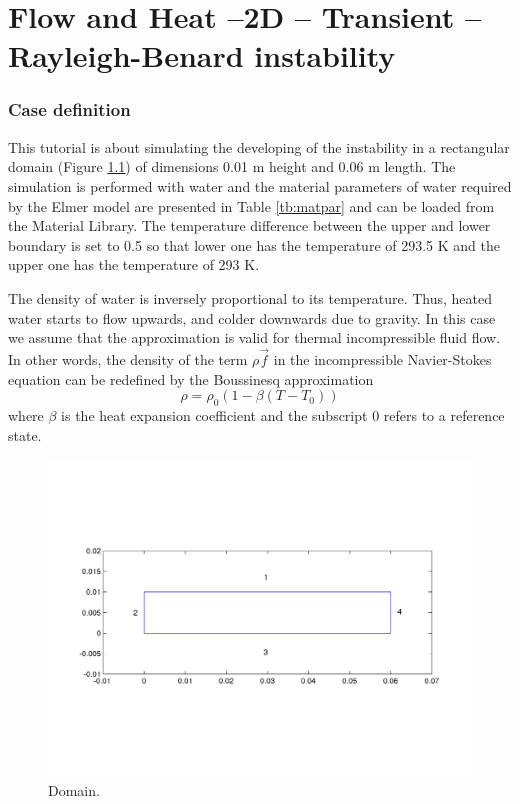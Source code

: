 \chapter{Flow and Heat --2D -- Transient -- Rayleigh-Benard instability}



\subsection*{Case definition}

This tutorial is about simulating the developing of the
 instability in a rectangular domain  (Figure
\ref{fg:rb_geometry}) of dimensions 0.01 m height and 0.06 m
length. The simulation is performed with water and the material
parameters of water required by the Elmer model are presented in 
Table \ref{tb:matpar} and can be loaded from the Material Library. 
The temperature difference between the upper and lower boundary is set to
0.5 so that lower one has the temperature of  293.5 K and the upper
one has the temperature of 293 K.


The density of water is inversely proportional to its
temperature. Thus, heated water starts to flow upwards, and colder
downwards due to gravity.  In this case we assume that the
 approximation is valid for thermal incompressible
fluid flow. In other words, the density of the term $\rho$$\vec{f}$ in
the incompressible Navier-Stokes equation can be redefined by the
Boussinesq approximation
\begin{displaymath}
\rho = {\rho}_0(1-\beta(T-{T}_0))
\end{displaymath}
where $\beta$ is the heat expansion coefficient and the subscript 0 
refers to a reference state.


\begin{figure}[h]
\centering
\includegraphics[width=150 mm, height=55 mm]{rb_geometry}
\caption{Domain.}\label{fg:rb_geometry}
\end{figure}  


